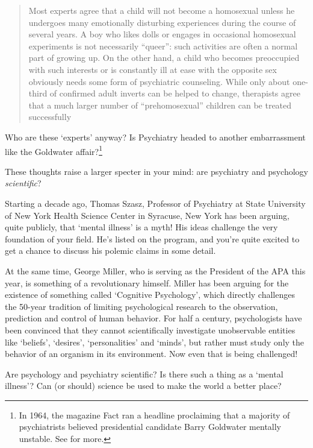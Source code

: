 \begin{refsection}
\begin{quote}

Most experts agree that a child will not become a homosexual unless he undergoes many emotionally disturbing experiences during the course of several years. A boy who likes dolls or engages in occasional homosexual experiments is not necessarily ``queer'': such activities are often a normal part of growing up. On the other hand, a child who becomes preoccupied with such interests or is constantly ill at ease with the opposite sex obviously needs some form of psychiatric counseling. While only about one-third of confirmed adult inverts can be helped to change, therapists agree that a much larger number of ``prehomosexual'' children can be treated successfully
\end{quote}

Who are these `experts' anyway? Is Psychiatry headed to another embarrassment like the Goldwater affair?\footnote{In 1964, the magazine Fact ran a headline proclaiming that a majority of psychiatrists believed presidential candidate Barry Goldwater mentally unstable. See  for more.}

These thoughts raise a larger specter in your mind: are psychiatry and psychology \emph{scientific}?

Starting a decade ago, Thomas Szasz, Professor of Psychiatry at State University of New York Health Science Center in Syracuse, New York has been arguing, quite publicly, that `mental illness' is a myth! His ideas challenge the very foundation of your field. He's listed on the program, and you're quite excited to get a chance to discuss his polemic claims in some detail.

At the same time, George Miller, who is serving as the President of the APA this year, is something of a revolutionary himself. Miller has been arguing for the existence of something called `Cognitive Psychology', which directly challenges the 50-year tradition of limiting psychological research to the observation, prediction and control of human behavior. For half a century, psychologists have been convinced that they cannot scientifically investigate unobservable entities like ‘beliefs’, ‘desires’, ‘personalities’ and ‘minds’, but rather must study only the behavior of an organism in its environment. Now even that is being challenged!

Are psychology and psychiatry scientific? Is there such a thing as a `mental illness'? Can (or should) science be used to make the world a better place? 


\end{refsection}
